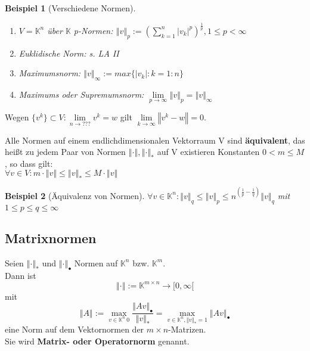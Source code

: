 \documentclass[a4paper,10pt]{scrartcl}
\newcommand{\norm}[1]{ \left\Vert #1 \right\Vert }
\newtheorem[L]{satz}{Satz}[section]
\newtheorem{bsp}{Beispiel}[section]
\newtheorem[S]{beweis}{Beweis}
\newtheorem[S]{beh}{Behauptung}
\begin{document}
\smallskip

\begin{bsp}[Verschiedene Normen]
\begin{enumerate}
 \item  $V = \mathbb{K}^n$ über $\mathbb{K}$
  p-Normen:
  $\norm{ v }_p := (\sum \limits_{k=1}^{n} |v_k|^p )^{\frac{1}{p}}, 1 \leq p < \infty$
  \item Euklidische Norm:
  s. LA II

 \item  Maximumsnorm:
  $\norm{v}_\infty := max\{|v_k|: k=1:n\}$
 \item  Maximums oder Supremumsnorm:
  $\lim\limits_{p \rightarrow \infty} \norm{v}_p = \norm{v}_\infty$
\end{enumerate}
\end{bsp}

Wegen $\{v^k\} \subset V : \lim\limits_{n \rightarrow ???} v^k = w $ gilt $ \lim\limits_{k \rightarrow \infty} \norm{v^ k - w} = 0 $.

\smallskip

\begin{satz}
Alle Normen auf einem endlichdimensionalen Vektorraum V sind \textbf{äquivalent}, das heißt zu jedem Paar von Normen $ \norm{\cdot}, \norm{\cdot}_* $ auf V existieren Konstanten
$0 < m \leq M$, so dass gilt:\\
$\forall v \in V: m \cdot \norm{v} \leq \norm{v}_* \leq M \cdot \norm{v} $
\end{satz}

\begin{bsp}[Äquivalenz von Normen]
$\forall v \in \mathbb{K}^n:
\norm{v}_q \leq \norm{v}_p \leq n^{(\frac{1}{p} - \frac{1}{q})} \norm{v}_q$ mit 
$1 \leq p \leq q \leq \infty$
\end{bsp}


\subsection{Matrixnormen}
\begin{satz}[Matrixnorm]
Seien $\norm{\cdot}_* $ und $ \norm{\cdot}_\bullet $ Normen auf $\mathbb{K}^n$ bzw. $\mathbb{K}^m$.\\
Dann ist $$ \norm{\cdot} := \mathbb{K}^{ m \times n} \rightarrow [0, \infty [ $$ mit
                                                                                                                                                                     $$\norm{A} := \max \limits_{v \in \mathbb{K}^n \ {0}} { \frac{\norm{Av}_\bullet}{\norm{v}_*}} = \max\limits_{v \in \mathbb{K}^n, \norm{v}_* = 1} { {\norm{Av}_\bullet}}$$
eine Norm auf dem Vektornormen der $m \times n$-Matrizen.\\
Sie wird \textbf{Matrix- oder Operatornorm} genannt.
\end{satz}
\end{document}
